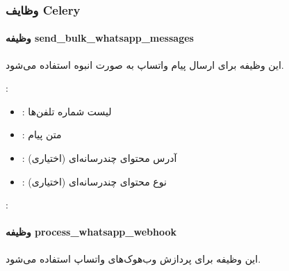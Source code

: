 \documentclass[letterpaper,10pt,english]{sphinxmanual}
\begin{document}
\subsubsection{وظایف Celery}
\label{\detokenize{modules/whatsapp_api:celery}}

\paragraph{وظیفه send\_bulk\_whatsapp\_messages}
\label{\detokenize{modules/whatsapp_api:send-bulk-whatsapp-messages}}
\sphinxAtStartPar
این وظیفه برای ارسال پیام واتساپ به صورت انبوه استفاده می‌شود.

\sphinxAtStartPar
{}:
\begin{itemize}
\item {} 
\sphinxAtStartPar
{}: لیست شماره تلفن‌ها

\item {} 
\sphinxAtStartPar
{}: متن پیام

\item {} 
\sphinxAtStartPar
{}: آدرس محتوای چندرسانه‌ای (اختیاری)

\item {} 
\sphinxAtStartPar
{}: نوع محتوای چندرسانه‌ای (اختیاری)

\end{itemize}

\sphinxAtStartPar
{}:

\begin{sphinxVerbatim}[commandchars=\\\{\}]
 

    \PYG{p}{[} \PYG{p}{]}
\end{sphinxVerbatim}


\paragraph{وظیفه process\_whatsapp\_webhook}
\label{\detokenize{modules/whatsapp_api:process-whatsapp-webhook}}
\sphinxAtStartPar
این وظیفه برای پردازش وب‌هوک‌های واتساپ استفاده می‌شود.
\end{document}
